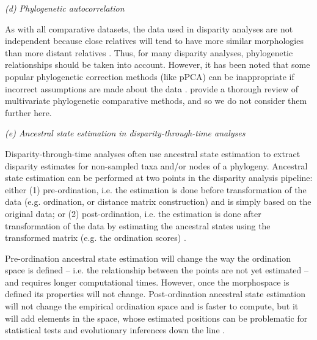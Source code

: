 \documentclass[12pt,letterpaper]{article}
\renewcommand{\subsection}[1]{%
\bigskip
\begin{center}
\begin{large}
\normalfont\itshape #1
\end{large}
\end{center}}
\begin{document}
\subsection{(d) Phylogenetic autocorrelation}

As with all comparative datasets, the data used in disparity analyses are not independent because close relatives will tend to have more similar morphologies than more distant relatives \citep{Harvey1998-xg}.
Thus, for many disparity analyses, phylogenetic relationships should be
taken into account.
However, it has been noted that some popular phylogenetic correction methods (like pPCA) can be inappropriate
if incorrect assumptions are made about the data \citep{Uyeda2015}.
provide a thorough review of multivariate phylogenetic comparative methods, and so we do not consider them further here.

\subsection{(e) Ancestral state estimation in disparity-through-time analyses}

Disparity-through-time analyses often use ancestral state estimation to extract disparity estimates for non-sampled taxa and/or nodes of a phylogeny.
Ancestral state estimation can be performed at two points in the disparity analysis pipeline: either (1) pre-ordination, i.e. the estimation is done before transformation of the data (e.g. ordination, or distance matrix construction) and is simply based on the original data; or (2) post-ordination, i.e. the estimation is done after transformation of the data by estimating the ancestral states using the transformed matrix (e.g. the ordination scores) \citep{lloyd2018}.

Pre-ordination ancestral state estimation will change the way the ordination space is defined -- i.e. the relationship between the points are not yet estimated -- and requires longer computational times.
However, once the morphospace is defined its properties will not change.
Post-ordination ancestral state estimation will not change the empirical ordination space and is faster to compute, but it will add elements in the space, whose estimated positions can be problematic for statistical tests and evolutionary inferences down the line \citep{lloyd2018}.
\end{document}
